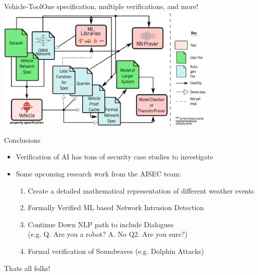 \documentclass[t,compress,aspectratio=169]{beamer}
\begin{document}


	

\begin{frame}{Vehicle-Tool}{One specification, multiple verifications, and more!}
\centering\vspace{-0.5cm}\includegraphics[width=0.8\textwidth]{img/vehicle-overview.pdf}
\end{frame}



% 
\begin{frame}{Conclusions}
	\begin{itemize}
		\item Verification of AI has  tons of security case studies to investigate
        \item Some upcoming research work from the AISEC team:
        \begin{enumerate}
            \item  Create a detailed mathematical representation of different weather events
            \item Formally Verified ML based Network Intrusion Detection
            \item Continue Down NLP path to include Dialogues\\ (e.g. Q. Are you a robot? A. No Q2. Are you sure?)
            \item Formal verification of Soundwaves (e.g. Dolphin Attacks)
        \end{enumerate}

	\end{itemize}

\vspace{1em}
\Large \centering Thats all folks!

\end{frame}
\end{document}

